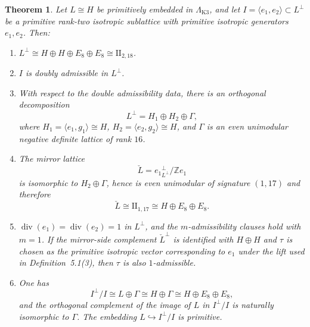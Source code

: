 \documentclass[12pt]{article}
\theoremstyle{plain}
\newtheorem{theorem}{Theorem}[section]
\theoremstyle{definition}
\DeclareMathOperator{\divis}{div}
\newcommand{\bZ}{\mathbb{Z}}
\newcommand{\LambdaK}{\Lambda_{\mathrm{K3}}}
\newcommand{\Lcheck}{\check{L}}
\begin{document}
\begin{theorem}\label{thm:mirror-H}
Let $L\cong H$ be primitively embedded in $\LambdaK$, and let $I=\langle e_1,e_2\rangle\subset L^\perp$ be a primitive rank-two isotropic sublattice with primitive isotropic generators $e_1,e_2$.  Then:
\begin{enumerate}
\item $L^\perp\cong H\oplus H\oplus E_8\oplus E_8\cong \mathrm{II}_{2,18}$.
\item $I$ is doubly admissible in $L^\perp$.
\item With respect to the double admissibility data, there is an orthogonal decomposition
\[
L^\perp = H_1\oplus H_2\oplus \Gamma,
\]
where $H_1=\langle e_1,g_1\rangle\cong H$, $H_2=\langle e_2,g_2\rangle\cong H$, and $\Gamma$ is an even unimodular negative definite lattice of rank $16$.
\item The mirror lattice
\[
\Lcheck = {e_1}^{\perp}_{L^{\perp}}/\bZ e_1
\]
is isomorphic to $H_2\oplus\Gamma$, hence is even unimodular of signature $(1,17)$ and therefore
\[
\Lcheck \cong \mathrm{II}_{1,17}\cong H\oplus E_8\oplus E_8.
\]
\item $\divis(e_1)=\divis(e_2)=1$ in $L^\perp$, and the $m$-admissibility clauses hold with $m=1$.  If the mirror-side complement $\Lcheck^\perp$ is identified with $H\oplus H$ and $\tau$ is chosen as the primitive isotropic vector corresponding to $e_1$ under the lift used in Definition~5.1(3), then $\tau$ is also $1$-admissible.
\item One has
\[
I^\perp/I \cong L\oplus \Gamma \cong H\oplus \Gamma \cong H\oplus E_8\oplus E_8,
\]
and the orthogonal complement of the image of $L$ in $I^\perp/I$ is naturally isomorphic to $\Gamma$.  The embedding $L\hookrightarrow I^\perp/I$ is primitive.
\end{enumerate}
\end{theorem}
\end{document}
